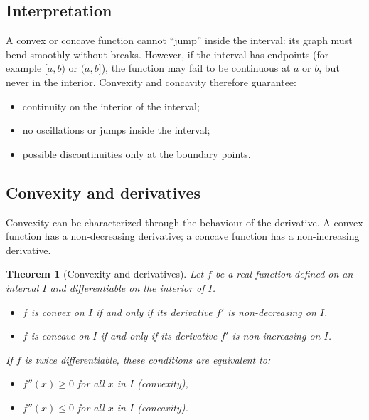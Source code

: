 \documentclass[11pt,a4paper]{article}
\theoremstyle{definition} \newtheorem{definition}{Definition} \theoremstyle{plain} \newtheorem{theorem}{Theorem}
\begin{document}
\subsection*{Interpretation}
A convex or concave function cannot ``jump'' inside the interval:
its graph must bend smoothly without breaks.
However, if the interval has endpoints (for example $[a,b)$ or $(a,b]$), the function may fail to be continuous at $a$ or $b$, but never in the interior.
Convexity and concavity therefore guarantee: \begin{itemize}
\item continuity on the interior of the interval;
\item no oscillations or jumps inside the interval;
\item possible discontinuities only at the boundary points. \end{itemize}
\subsection{Convexity and derivatives}
Convexity can be characterized through the behaviour of the derivative.
A convex function has a non-decreasing derivative; a concave function has a non-increasing derivative.
\begin{theorem}[Convexity and derivatives]\label{thm:convexity-derivatives} Let $f$ be a real function defined on an interval $I$ and differentiable on the interior of $I$. \begin{itemize}
\item $f$ is convex on $I$ if and only if its derivative $f'$ is non-decreasing on $I$.
\item $f$ is concave on $I$ if and only if its derivative $f'$ is non-increasing on $I$. \end{itemize} If $f$ is twice differentiable, these conditions are equivalent to: \begin{itemize}
\item $f''(x) \ge 0$ for all $x$ in $I$
\quad (convexity),
\item $f''(x) \le 0$ for all $x$ in $I$
\quad (concavity). \end{itemize} \end{theorem}
\end{document}
